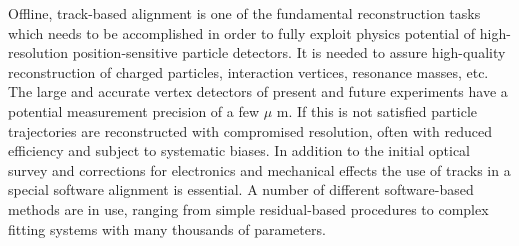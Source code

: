 Offline, track-based alignment is one of the fundamental reconstruction tasks which needs to be accomplished in order to fully exploit physics potential of high-resolution position-sensitive particle detectors.
It is needed to assure high-quality reconstruction of charged particles, interaction vertices, resonance masses, etc.
The large and accurate vertex detectors of present and future experiments have a potential measurement precision of a few $\mu$ m.
If this is not satisfied particle trajectories are reconstructed with compromised resolution, often with reduced efficiency and subject to systematic biases.
In addition to the initial optical survey and corrections for electronics and mechanical effects the use of tracks in a special software alignment is essential.
A number of different software-based methods are in use, ranging from simple residual-based procedures to complex fitting systems with many thousands of parameters.

